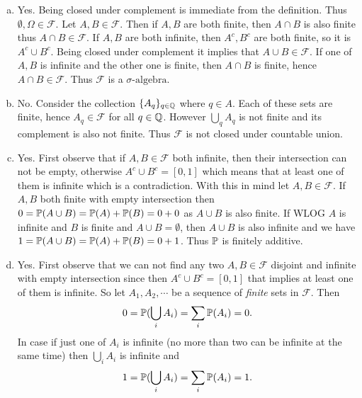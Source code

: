 \begin{solution}
	\begin{enumerate}[(a)]
		\item Yes. Being closed under complement is immediate from the definition. Thus $ \emptyset, \Omega \in \mathcal{F} $. Let $ A,B \in\mathcal{F} $. Then if $ A,B $ are both finite, then $ A\cap B $ is also finite thus $ A\cap B \in \mathcal{F} $. If $ A,B $ are both infinite, then $ A^c, B^c $ are both finite, so it is $ A^c \cup B^c $. Being closed under complement it implies that $ A\cup B  \in \mathcal{F}$. If one of $ A,B $ is infinite and the other one is finite, then $ A \cap B $ is finite, hence $ A\cap B \in \mathcal{F} $. Thus $ \mathcal{F} $ is a $\sigma\text{-algebra}$.
		\item No. Consider the collection $ \{A_q\}_{q \in \mathbb{Q}} $ where $ q \in A  $. Each of these sets are finite, hence $ A_q \in \mathcal{F} $ for all $ q \in \mathbb{Q} $. However $ \bigcup_q A_q $ is not finite and its complement is also not finite. Thus $ \mathcal{F} $ is not closed under countable union. 
		\item Yes. First observe that if $ A,B \in \mathcal{F} $ both infinite, then their intersection can not be empty, otherwise $ A^c \cup B^c = [0,1] $ which means that at least one of them is infinite which is a contradiction. With this in mind let $ A,B \in \mathcal{F} $. If $  A,B $ both finite with empty intersection then $ 0 = \mathbb{P}(A\cup B) = \mathbb{P}(A) + \mathbb{P}(B) = 0 + 0 $ as $ A\cup B $ is also finite. If WLOG $ A $ is infinite and $ B $ is finite and $ A\cup B = \emptyset$, then $ A\cup B $ is also infinite and we have $ 1 = \mathbb{P}(A\cup B) = \mathbb{P}(A) + \mathbb{P}(B) = 0 + 1 $. Thus $ \mathbb{P} $ is finitely additive.
		\item Yes. First observe that we can not find any two $ A,B \in \mathcal{F} $ disjoint and infinite with empty intersection since then $ A^c\cup B^c = [0,1] $ that implies at least one of them is infinite. So let $ A_1,A_2,\cdots $ be a sequence of \emph{finite} sets in $ \mathcal{F} $. Then 
		\[ 0 = \mathbb{P}(\bigcup_i A_i) = \sum_i \mathbb{P}(A_i) = 0. \]
		In case if just one of $ A_i $ is infinite (no more than two can be infinite at the same time) then 
		$ \bigcup_i A_i  $ is infinite and 
		\[ 1 = \mathbb{P}(\bigcup_i A_i) = \sum_i \mathbb{P}(A_i) = 1.  \]
	\end{enumerate}
\end{solution}

